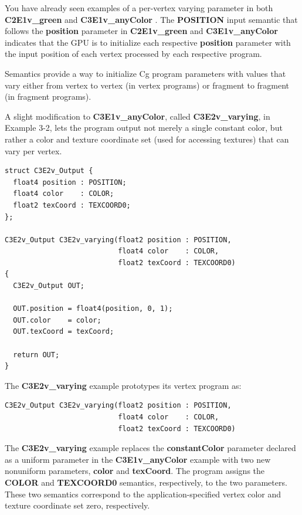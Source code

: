 \documentclass{book}
\begin{document}
You have already seen examples of a per-vertex varying parameter in both \textbf{C2E1v_green} and \textbf{C3E1v_anyColor} . The \textbf{POSITION} input semantic that follows the \textbf{position} parameter in \textbf{C2E1v_green} and \textbf{C3E1v_anyColor} indicates that the GPU is to initialize each respective \textbf{position} parameter with the input position of each vertex processed by each respective program.

Semantics provide a way to initialize Cg program parameters with values that vary either from vertex to vertex (in vertex programs) or fragment to fragment (in fragment programs).

A slight modification to \textbf{C3E1v_anyColor}, called \textbf{C3E2v_varying}, in Example 3-2, lets the program output not merely a single constant color, but rather a color and texture coordinate set (used for accessing textures) that can vary per vertex.

\FloatBarrier
\begin{lstlisting}[caption=Example 3-2. The C3E2v_varying Vertex Program]
struct C3E2v_Output {
  float4 position : POSITION;
  float4 color    : COLOR;
  float2 texCoord : TEXCOORD0;
};

C3E2v_Output C3E2v_varying(float2 position : POSITION,
                           float4 color    : COLOR,
                           float2 texCoord : TEXCOORD0)
{
  C3E2v_Output OUT;

  OUT.position = float4(position, 0, 1);
  OUT.color    = color;
  OUT.texCoord = texCoord;

  return OUT;
}
\end{lstlisting}
\FloatBarrier

The \textbf{C3E2v_varying} example prototypes its vertex program as:

\FloatBarrier
\begin{lstlisting}
C3E2v_Output C3E2v_varying(float2 position : POSITION,
                           float4 color    : COLOR,
                           float2 texCoord : TEXCOORD0)
\end{lstlisting}
\FloatBarrier

The \textbf{C3E2v_varying} example replaces the \textbf{constantColor} parameter declared as a uniform parameter in the \textbf{C3E1v_anyColor} example with two new nonuniform parameters, \textbf{color} and \textbf{texCoord}. The program assigns the \textbf{COLOR} and \textbf{TEXCOORD0} semantics, respectively, to the two parameters. These two semantics correspond to the application-specified vertex color and texture coordinate set zero, respectively.
\end{document}
